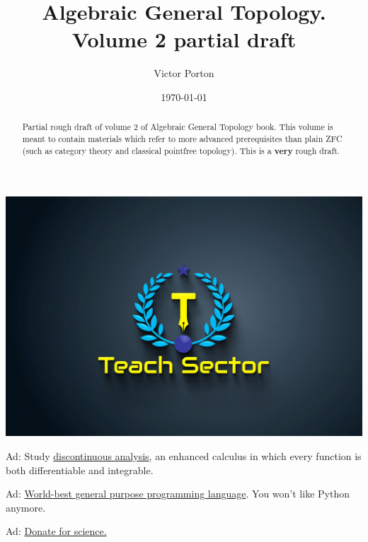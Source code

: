 \documentclass[a4paper,oneside,english,reqno]{amsbook}
\begin{document}
\noindent
\href{https://teachsector.com/limit/}{\includegraphics[scale=0.3]{img/Teach-Sector.jpeg}}

\noindent
Ad: Study \href{https://teachsector.com/limit/}{discontinuous analysis}, an enhanced
calculus in which every function is both differentiable and integrable.

\noindent
Ad: \href{https://teachsector.com/dforpython/}{World-best general purpose programming language}.
You won't like Python anymore.

\noindent
Ad: \href{https://science-dao.vporton.name}{Donate for science.}

\title{Algebraic General Topology. Volume 2 partial draft}

\author{Victor Porton}





\date{\today}


\begin{abstract}
Partial rough draft of volume 2 of Algebraic General Topology book.
This volume is meant to contain materials which refer to more advanced
prerequisites than plain ZFC (such as category theory and classical pointfree
topology). This is a \textbf{very} rough draft.
\end{abstract}




\end{document}
